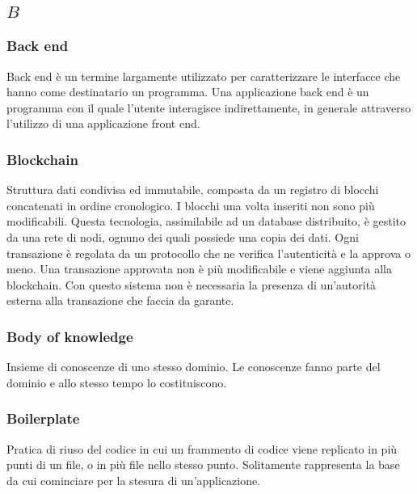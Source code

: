\subsection*{\quad$B\quad$}
\subsubsection*{Back end}
Back end è un termine largamente utilizzato per caratterizzare le interfacce che hanno come destinatario un programma. Una applicazione back end è un programma con il quale l’utente interagisce indirettamente, in generale attraverso l’utilizzo di una applicazione front end.

\subsubsection*{Blockchain}
Struttura dati condivisa ed immutabile, composta da un registro di blocchi concatenati in ordine cronologico. I blocchi una volta inseriti non sono più modificabili. Questa tecnologia, assimilabile ad un database distribuito, è gestito da una rete di nodi, ognuno dei quali possiede una copia dei dati.  Ogni transazione è regolata da un protocollo che ne verifica l'autenticità e la approva o meno. Una transazione approvata non è più modificabile e viene aggiunta alla blockchain. Con questo sistema non è necessaria la presenza di un'autorità esterna alla transazione che faccia da garante.

\subsubsection*{Body of knowledge}
Insieme di conoscenze di uno stesso dominio. Le conoscenze fanno parte del dominio e allo stesso tempo lo costituiscono.

\subsubsection*{Boilerplate}
Pratica di riuso del codice in cui un frammento di codice viene replicato in più punti di un file, o in più file nello stesso punto. Solitamente rappresenta la base da cui cominciare per la stesura di un'applicazione. 

